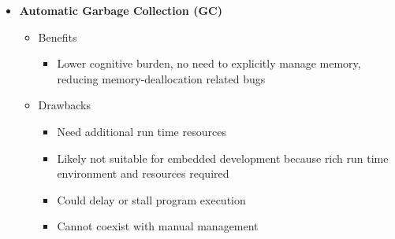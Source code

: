 \begin{definition}
\begin{itemize}
\begin{itemize}
\begin{itemize}
            \end{itemize}
        \end{itemize}
        \item \textbf{Automatic Garbage Collection (GC)}
        \begin{itemize}
            \item Benefits
            \begin{itemize}
                \item Lower cognitive burden, no need to explicitly manage memory, reducing memory-deallocation related bugs
            \end{itemize}
            \item Drawbacks
            \begin{itemize}
                \item Need additional run time resources
                \item Likely not suitable for embedded development because rich run time environment and resources required
                \item Could delay or stall program execution
                \item Cannot coexist with manual management
            \end{itemize}
        \end{itemize}
    \end{itemize}
\end{definition}
